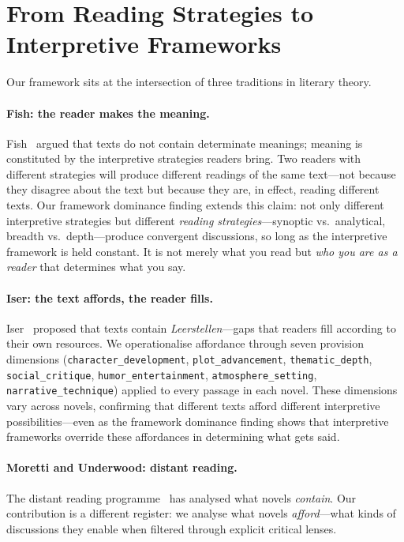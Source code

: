 \documentclass[final]{clv2025}
\begin{document}
\section{From Reading Strategies to Interpretive Frameworks}
\label{sec:theory}

Our framework sits at the intersection of three traditions in literary
theory.

\paragraph{Fish: the reader makes the meaning.}
Fish~\cite{fish1980text} argued that texts do not contain determinate
meanings; meaning is constituted by the interpretive strategies readers
bring.  Two readers with different strategies will produce different
readings of the same text---not because they disagree about the text
but because they are, in effect, reading different texts.  Our
framework dominance finding extends this claim: not only different interpretive
strategies but different \emph{reading strategies}---synoptic vs.\
analytical, breadth vs.\ depth---produce convergent discussions, so
long as the interpretive framework is held constant.  It is not merely
what you read but \emph{who you are as a reader} that determines what
you say.

\paragraph{Iser: the text affords, the reader fills.}
Iser~\cite{iser1978act} proposed that texts contain
\emph{Leerstellen}---gaps that readers fill according to their own
resources.  We operationalise affordance through seven provision
dimensions (\texttt{character\_development},
\texttt{plot\_advancement}, \texttt{thematic\_depth},
\texttt{social\_critique}, \texttt{humor\_entertainment},
\texttt{atmosphere\_setting}, \texttt{narrative\_technique}) applied to
every passage in each novel.  These dimensions vary across novels,
confirming that different texts afford different interpretive
possibilities---even as the framework dominance finding shows that
interpretive frameworks override these affordances in determining what
gets said.

\paragraph{Moretti and Underwood: distant reading.}
The distant reading programme~\cite{moretti2013distant,
underwood2019distant} has analysed what novels \emph{contain}.  Our
contribution is a different register: we analyse what novels
\emph{afford}---what kinds of discussions they enable when filtered
through explicit critical lenses.
\end{document}
